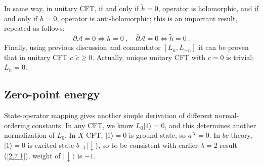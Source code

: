 In same way, in unitary CFT, if and only if $\tilde{h}=0$, operator is holomorphic, and if and only if $h=0$, operator is anti-holomorphic;    
this is an important result, repeated as follows:    
\begin{equation}
	\partial \mathscr{A}=0 \Leftrightarrow h=0 \:, \quad \bar{\partial} \mathscr{A}=0 \Leftrightarrow \tilde{h}=0 \:. \label{2.9.16}
\end{equation}
Finally, using previous discussion and commutator $\left[L_{n}, L_{-n}\right]$ it can be proven that in unitary CFT $c, \tilde{c} \geq 0$.    
Actually, unique unitary CFT with $c=0$ is trivial: $L_n=0$.    

\subsection*{Zero-point energy}
State-operator mapping gives another simple derivation of different normal-ordering constants. In any CFT, we know $L_{0}|1\rangle=0$, and this determines another normalization of $L_0$.    
In $X$ CFT, $|1\rangle=0$ is ground state, so $a^X=0$.    
In $bc$ theory, $|1\rangle=0$ is excited state $b_{-1}\lvert \downarrow\rangle$, so to be consistent with earlier $\lambda=2$ result (\ref{2.7.1}), weight of $\lvert \downarrow\rangle$ is $-1$.    


